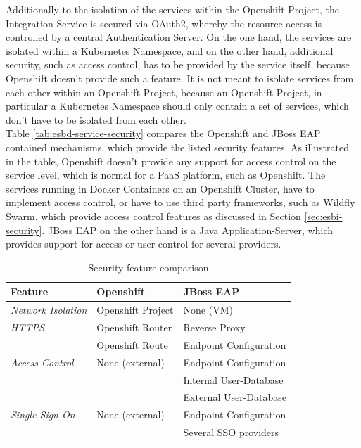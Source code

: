 Additionally to the isolation of the services within the Openshift Project, the Integration Service is secured via OAuth2, whereby the resource access is controlled by a central Authentication Server. On the one hand, the services are isolated within a Kubernetes Namespace, and on the other hand, additional security, such as access control, has to be provided by the service itself, because Openshift doesn't provide such a feature. It is not meant to isolate services from each other within an Openshift Project, because an Openshift Project, in particular a Kubernetes Namespace should only contain a set of services, which don't have to be isolated from each other. \\

Table \vref{tab:esbd-service-security} compares the Openshift and JBoss EAP contained mechanisms, which provide the listed security features. As illustrated in the table, Openshift doesn't provide any support for access control on the service level, which is normal for a PaaS platform, such as Openshift. The services running in Docker Containers on an Openshift Cluster, have to implement access control, or have to use third party frameworks, such as Wildfly Swarm, which provide access control features as discussed in Section \vref{sec:esbi-security}. JBoss EAP on the other hand is a Java Application-Server, which provides support for access or user control for several providers. 

{\renewcommand{\arraystretch}{1.2}%
	\begin{table}[h]
		\begin{tabularx}{\textwidth}{ X|X|X }	
			\textbf{Feature}                 & \textbf{Openshift}      & \textbf{JBoss EAP} \\  \hline
			\textit{Network Isolation}       & Openshift Project       & None (VM) \\  \hline
			\textit{HTTPS}                   & Openshift Router        & Reverse Proxy \\
			                                 & Openshift Route         & Endpoint Configuration \\  \hline
            \textit{Access Control}          & None (external)         & Endpoint Configuration \\
                                                                      && Internal User-Database \\ 
                                                                      && External User-Database \\  \hline
            \textit{Single-Sign-On}          & None (external)         & Endpoint Configuration \\
                                                                      && Several SSO providers \\  \hline
		\end{tabularx}
		\caption{Security feature comparison}
		\label{tab:esbd-service-security}
\end{table}}

